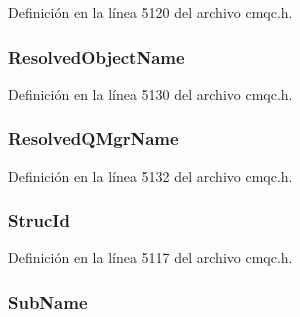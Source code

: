 Definición en la línea 5120 del archivo cmqc.\+h.

\hypertarget{structtag_m_q_s_t_s_a75cc42c205c810ff5e2d33b15568f940}{}
\subsubsection[{Resolved\+Object\+Name}]{ Resolved\+Object\+Name}\label{structtag_m_q_s_t_s_a75cc42c205c810ff5e2d33b15568f940}


Definición en la línea 5130 del archivo cmqc.\+h.

\hypertarget{structtag_m_q_s_t_s_af36c1b6e6f3f92e0c733c43da9fada3f}{}
\subsubsection[{Resolved\+Q\+Mgr\+Name}]{ Resolved\+Q\+Mgr\+Name}\label{structtag_m_q_s_t_s_af36c1b6e6f3f92e0c733c43da9fada3f}


Definición en la línea 5132 del archivo cmqc.\+h.

\hypertarget{structtag_m_q_s_t_s_a0530922ca944569b52601d74941f96e4}{}
\subsubsection[{Struc\+Id}]{ Struc\+Id}\label{structtag_m_q_s_t_s_a0530922ca944569b52601d74941f96e4}


Definición en la línea 5117 del archivo cmqc.\+h.

\hypertarget{structtag_m_q_s_t_s_a52ada97ac3869da3a2f04de08ed4c8d3}{}
\subsubsection[{Sub\+Name}]{ Sub\+Name}\label{structtag_m_q_s_t_s_a52ada97ac3869da3a2f04de08ed4c8d3}


